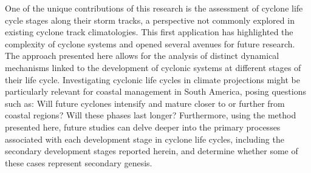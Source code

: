 One of the unique contributions of this research is the assessment of cyclone life cycle stages along their storm tracks, a perspective not commonly explored in existing cyclone track climatologies. This first application has highlighted the complexity of cyclone systems and opened several avenues for future research. The approach presented here allows for the analysis of distinct dynamical mechanisms linked to the development of cyclonic systems at different stages of their life cycle. Investigating cyclonic life cycles in climate projections might be particularly relevant for coastal management in South America, posing questions such as: Will future cyclones intensify and mature closer to or further from coastal regions? Will these phases last longer? Furthermore, using the method presented here, future studies can delve deeper into the primary processes associated with each development stage in cyclone life cycles, including the secondary development stages reported herein, and determine whether some of these cases represent secondary genesis.



